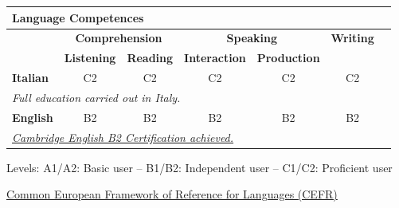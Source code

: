 \documentclass[a4paper, 10pt]{article}
\begin{document}


\centering
\renewcommand{\arraystretch}{1.3}
\begin{tabularx}{\textwidth}{lcccccc}
	\multicolumn{6}{l}{\textbf{{Language Competences}}} \\[4pt]
	\toprule
	& \multicolumn{2}{c}{\textbf{Comprehension}} & \multicolumn{2}{c}{\textbf{Speaking}} & \multicolumn{1}{c}{\textbf{Writing}} \\[3pt]
	\cmidrule(lr){2-3} \cmidrule(lr){4-5}
	& \textbf{Listening} & \textbf{Reading} & \textbf{Interaction} & \textbf{Production} \\
	\midrule
	\textbf{Italian} & C2 & C2 & C2 & C2 & C2 \\
	\multicolumn{6}{l}{\textit{Full education carried out in Italy.}} \\[3pt]
	\textbf{English} & B2 & B2 & B2 & B2 & B2 \\
	\multicolumn{6}{l}{\href{https://github.com/ShyVortex/angelo-resume/blob/main/Certs/B2Cert.pdf}{\textit{Cambridge English B2 Certification achieved.}}} \\
	\bottomrule
\end{tabularx}

\vspace{4pt}
{\footnotesize
	Levels: A1/A2: Basic user – B1/B2: Independent user – C1/C2: Proficient user \par
	\href{https://europass.europa.eu/system/files/2020-05/CEFR\%20self-assessment\%20grid\%20EN.pdf}{Common European Framework of Reference for Languages (CEFR)}
}\vspace{4pt}
\end{document}
